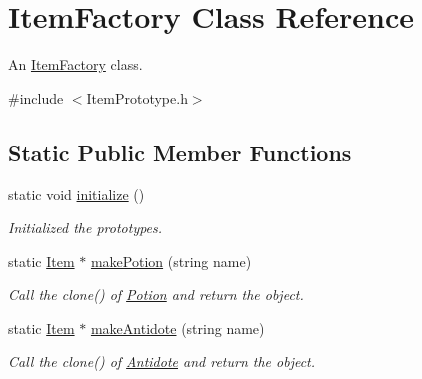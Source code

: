 \hypertarget{class_item_factory}{}\section{Item\+Factory Class Reference}
\label{class_item_factory}


An \hyperlink{class_item_factory}{Item\+Factory} class.  




{\ttfamily \#include $<$Item\+Prototype.\+h$>$}

\subsection*{Static Public Member Functions}
\begin{DoxyCompactItemize}
\item 
\hypertarget{class_item_factory_a7c6bdc209944c5b0e6a98da6434ef1f7}{}static void \hyperlink{class_item_factory_a7c6bdc209944c5b0e6a98da6434ef1f7}{initialize} ()\label{class_item_factory_a7c6bdc209944c5b0e6a98da6434ef1f7}

\begin{DoxyCompactList}\small\item\em Initialized the prototypes. \end{DoxyCompactList}\item 
\hypertarget{class_item_factory_a47e59f627e5a3ab710138ae6f1c7e6da}{}static \hyperlink{class_item}{Item} $\ast$ \hyperlink{class_item_factory_a47e59f627e5a3ab710138ae6f1c7e6da}{make\+Potion} (string name)\label{class_item_factory_a47e59f627e5a3ab710138ae6f1c7e6da}

\begin{DoxyCompactList}\small\item\em Call the clone() of \hyperlink{class_potion}{Potion} and return the object. \end{DoxyCompactList}\item 
\hypertarget{class_item_factory_a0ece2a36df02fa03f27bf99f145b9019}{}static \hyperlink{class_item}{Item} $\ast$ \hyperlink{class_item_factory_a0ece2a36df02fa03f27bf99f145b9019}{make\+Antidote} (string name)\label{class_item_factory_a0ece2a36df02fa03f27bf99f145b9019}

\begin{DoxyCompactList}\small\item\em Call the clone() of \hyperlink{class_antidote}{Antidote} and return the object. \end{DoxyCompactList}\end{DoxyCompactItemize}
